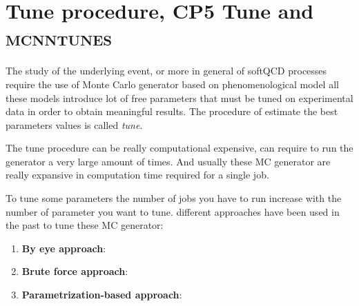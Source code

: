 \chapter{Tune procedure, CP5 Tune and \textsc{mcnntunes}}
\label{chap:TuneprocedureCP5TuneandMCNNTUNES}

The study of the underlying event, or more in general of softQCD processes require the use of Monte Carlo generator based on phenomenological model all these models introduce lot of free parameters that must be tuned on experimental data in order to obtain meaningful results. The procedure of estimate the best parameters values is called \textit{tune}. 

The tune procedure can be really computational expensive,  can require to run the generator a very large amount of times. And usually these MC generator are really expansive in computation time required for a single job. 

To tune some parameters the number of jobs you have to run increase with the number of parameter you want to tune. different approaches have been used in the past to tune these MC generator:
\begin{enumerate}[label=\arabic*)]
	\item \textbf{By eye approach}:
	\item \textbf{Brute force approach}:
	\item \textbf{Parametrization-based approach}:
\end{enumerate} 